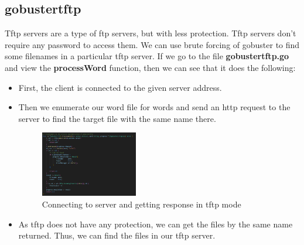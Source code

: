 \documentclass[12 pt]{article}
\begin{document}
\subsection{gobustertftp}
Tftp servers are a type of ftp servers, but with less protection. Tftp servers don’t require any password to access them. We can use brute forcing of gobuster to find some filenames in a particular tftp server. If we go to the file \textbf{gobustertftp.go} and view the \textbf{processWord} function, then we can see that it does the following:
\begin{itemize}
    \item First, the client is connected to the given server address.
    \item Then we enumerate our word file for words and send an http request to the server to find the target file with the same name there.
    \begin{figure}[H]
        \centering
        \includegraphics[width=0.4\textwidth]{Gobustertftp_processWord.png}
        \caption{Connecting to server and getting response in tftp mode}
        \label{fig: Gobustertftp processWord}
    \end{figure}
    \item As tftp does not have any protection, we can get the files by the same name returned. Thus, we can find the files in our tftp server.
\end{itemize}
\end{document}
